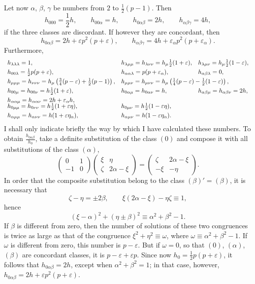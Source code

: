 \documentclass[11pt]{article}
\begin{document}
Let now $\alpha$, $\beta$, $\gamma$ be numbers from $2$ to $\frac12(p-1)$. Then
\[
h_{000}=\frac12h,\qquad
h_{00\alpha}=h,\qquad
h_{0\alpha\beta}=2h,\qquad
h_{\alpha\beta\gamma}=4h,
\]
if the three classes are discordant. If however they are concordant, then
\[
h_{0\alpha\beta}=2h+\varepsilon p^2(p+\varepsilon),\qquad
h_{\alpha\beta\gamma}=4h+\varepsilon_\alpha p^2(p+\varepsilon_\alpha).
\]
Furthermore,
\[
\begin{array}{lll}
h_{\lambda\lambda\lambda}=1, &
h_{\lambda\mu\mu}=h_{\lambda\nu\nu}=h_\mu\frac12(1+\varepsilon), &
h_{\lambda\mu\nu}=h_\mu\frac12(1-\varepsilon),\\[0.35em]
h_{00\lambda}=\frac12p(p+\varepsilon), &
h_{\alpha\alpha\lambda}=p(p+\varepsilon_\alpha), &
h_{\alpha\beta\lambda}=0,\\[0.35em]
h_{\mu\mu\mu}=h_{\nu\nu\nu}=h_\mu\left(\frac34(p-\varepsilon)+\frac12(p-1)\right),&
\multicolumn{2}{l}{
h_{\mu\mu\nu}=h_{\mu\nu\nu}=h_\mu\left(\frac14(p-\varepsilon)-\frac12(1-\varepsilon)\right),}\\[0.35em]
h_{00\mu}=h_{00\nu}=h\frac12(1+\varepsilon),&
h_{0\alpha\mu}=h_{0\alpha\nu}=h,&
h_{\alpha\beta\mu}=h_{\alpha\beta\nu}=2h,\\[0.35em]
h_{\alpha\alpha\mu}=h_{\alpha\alpha\nu}=2h+\varepsilon_\alpha h,&&\\[-0.2em]
h_{0\mu\mu}=h_{0\nu\nu}=h\frac12(1+\varepsilon\eta),&
h_{0\mu\nu}=h\frac12(1-\varepsilon\eta),&\\[0.35em]
h_{\alpha\mu\mu}=h_{\alpha\nu\nu}=h(1+\varepsilon\eta_\alpha),&
h_{\alpha\mu\nu}=h(1-\varepsilon\eta_\alpha).&
\end{array}
\]
I shall only indicate briefly the way by which I have calculated these numbers. To obtain $\frac{h_{0\alpha\beta}}{h_0}$, take a definite substitution of the class $(0)$ and compose it with all substitutions of the class $(\alpha)$,
\[
\begin{pmatrix}0&1\\-1&0\end{pmatrix}
\begin{pmatrix}\xi&\eta\\ \zeta&2\alpha-\xi\end{pmatrix}
=
\begin{pmatrix}\zeta&2\alpha-\xi\\ -\xi&-\eta\end{pmatrix}.
\]
In order that the composite substitution belong to the class $(\beta)'=(\beta)$, it is necessary that
\[
\zeta-\eta=\pm2\beta,\qquad
\xi(2\alpha-\xi)-\eta\zeta\equiv1,
\]
hence
\[
(\xi-\alpha)^2+(\eta\pm\beta)^2\equiv\alpha^2+\beta^2-1.
\]
If $\beta$ is different from zero, then the number of solutions of these two congruences is twice as large as that of the congruence $\xi^2+\eta^2\equiv\omega$, where $\omega\equiv\alpha^2+\beta^2-1$. If $\omega$ is different from zero, this number is $p-\varepsilon$. But if $\omega=0$, so that $(0)$, $(\alpha)$, $(\beta)$ are concordant classes, it is $p-\varepsilon+\varepsilon p$. Since now $h_0=\frac12p(p+\varepsilon)$, it follows that $h_{0\alpha\beta}=2h$, except when $\alpha^2+\beta^2=1$; in that case, however, $h_{0\alpha\beta}=2h+\varepsilon p^2(p+\varepsilon)$.
\end{document}
